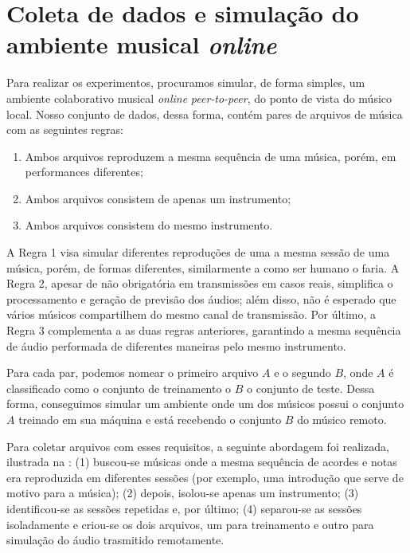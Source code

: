 \section{Coleta de dados e simulação do ambiente musical \textit{online}}
\label{sec:data_gathering}

Para realizar os experimentos, procuramos simular, de forma simples, um ambiente colaborativo musical \textit{online} \textit{peer-to-peer}, do ponto de vista do músico local. Nosso conjunto de dados, dessa forma, contém pares de arquivos de música com as seguintes regras:

\begin{enumerate}
    \item Ambos arquivos reproduzem a mesma sequência de uma música, porém, em performances diferentes;
    \item Ambos arquivos consistem de apenas um instrumento;
    \item Ambos arquivos consistem do mesmo instrumento.
\end{enumerate}

A Regra 1 visa simular diferentes reproduções de uma a mesma sessão de uma música, porém, de formas diferentes, similarmente a como ser humano o faria. A Regra 2, apesar de não obrigatória em transmissões em casos reais, simplifica o processamento e geração de previsão dos áudios; além disso, não é esperado que vários músicos compartilhem do mesmo canal de transmissão. Por último, a Regra 3 complementa a as duas regras anteriores, garantindo a mesma sequência de áudio performada de diferentes maneiras pelo mesmo instrumento.

Para cada par, podemos nomear o primeiro arquivo $A$ e o segundo $B$, onde $A$ é classificado como o conjunto de treinamento o $B$ o conjunto de teste. Dessa forma, conseguimos simular um ambiente onde um dos músicos possui o conjunto $A$ treinado em sua máquina e está recebendo o conjunto $B$ do músico remoto.

Para coletar arquivos com esses requisitos, a seguinte abordagem foi realizada, ilustrada na : (1) buscou-se músicas onde a mesma sequência de acordes e notas era reproduzida em diferentes sessões (por exemplo, uma introdução que serve de motivo para a música); (2) depois, isolou-se apenas um instrumento; (3) identificou-se as sessões repetidas e, por último; (4) separou-se as sessões isoladamente e criou-se os dois arquivos, um para treinamento e outro para simulação do áudio trasmitido remotamente.

